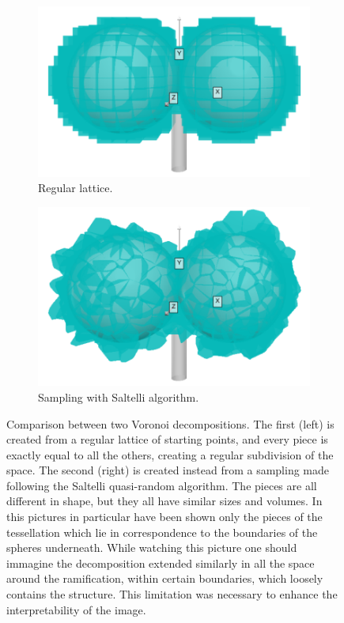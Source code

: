     \begin{figure}
        \centering
        \begin{subfigure}[b]{0.45\textwidth}
             \centering
             \includegraphics[width = \textwidth]{images/reg_vor}
             \caption{Regular lattice.}
             \label{fig:reg_vor}
        \end{subfigure}
        \hfill
        \begin{subfigure}[b]{0.45\textwidth}
             \centering
             \includegraphics[width = \textwidth]{images/sal_vor}
             \caption{Sampling with Saltelli algorithm.}
             \label{fig:sal_vor}
        \end{subfigure}
        \caption{Comparison between two Voronoi decompositions. The first (left) is created from a regular lattice of starting points, and every piece is exactly equal to all the others, creating a regular subdivision of the space. The second (right) is created instead from a sampling made following the Saltelli quasi-random algorithm. The pieces are all different in shape, but they all have similar sizes and volumes. In this pictures in particular have been shown only the pieces of the tessellation which lie in correspondence to the boundaries of the spheres underneath. While watching this picture one should immagine the decomposition extended similarly in all the space around the ramification, within certain boundaries, which loosely contains the structure. This limitation was necessary to enhance the interpretability of the image. }
        \label{fig:vor_comp}
    \end{figure}

